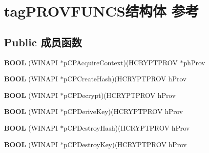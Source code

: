 \hypertarget{structtag_p_r_o_v_f_u_n_c_s}{}\section{tag\+P\+R\+O\+V\+F\+U\+N\+C\+S结构体 参考}
\label{structtag_p_r_o_v_f_u_n_c_s}
\subsection*{Public 成员函数}
\begin{DoxyCompactItemize}
\item 
\mbox{\label{structtag_p_r_o_v_f_u_n_c_s_a99a1ed3bb609325d601a875ba44be6db}} 
{\bfseries B\+O\+OL} (W\+I\+N\+A\+PI $\ast$p\+C\+P\+Acquire\+Context)(H\+C\+R\+Y\+P\+T\+P\+R\+OV $\ast$ph\+Prov
\item 
\mbox{\label{structtag_p_r_o_v_f_u_n_c_s_aaead84874e0b008bcd031f5c496e63b2}} 
{\bfseries B\+O\+OL} (W\+I\+N\+A\+PI $\ast$p\+C\+P\+Create\+Hash)(H\+C\+R\+Y\+P\+T\+P\+R\+OV h\+Prov
\item 
\mbox{\label{structtag_p_r_o_v_f_u_n_c_s_a0419f2413ee3a7d0d455e31020d88ade}} 
{\bfseries B\+O\+OL} (W\+I\+N\+A\+PI $\ast$p\+C\+P\+Decrypt)(H\+C\+R\+Y\+P\+T\+P\+R\+OV h\+Prov
\item 
\mbox{\label{structtag_p_r_o_v_f_u_n_c_s_a62fc86c21a48dc96a395e93a3621c2de}} 
{\bfseries B\+O\+OL} (W\+I\+N\+A\+PI $\ast$p\+C\+P\+Derive\+Key)(H\+C\+R\+Y\+P\+T\+P\+R\+OV h\+Prov
\item 
\mbox{\label{structtag_p_r_o_v_f_u_n_c_s_a9915203689b8f6b81edf759a9aae5828}} 
{\bfseries B\+O\+OL} (W\+I\+N\+A\+PI $\ast$p\+C\+P\+Destroy\+Hash)(H\+C\+R\+Y\+P\+T\+P\+R\+OV h\+Prov
\item 
\mbox{\label{structtag_p_r_o_v_f_u_n_c_s_a168b897658c3fec92db4ac162064cb43}} 
{\bfseries B\+O\+OL} (W\+I\+N\+A\+PI $\ast$p\+C\+P\+Destroy\+Key)(H\+C\+R\+Y\+P\+T\+P\+R\+OV h\+Prov
\item 
\mbox{\label{structtag_p_r_o_v_f_u_n_c_s_af4a343942eba836664d7f77f6b7743f3}} 

\end{DoxyCompactItemize}

